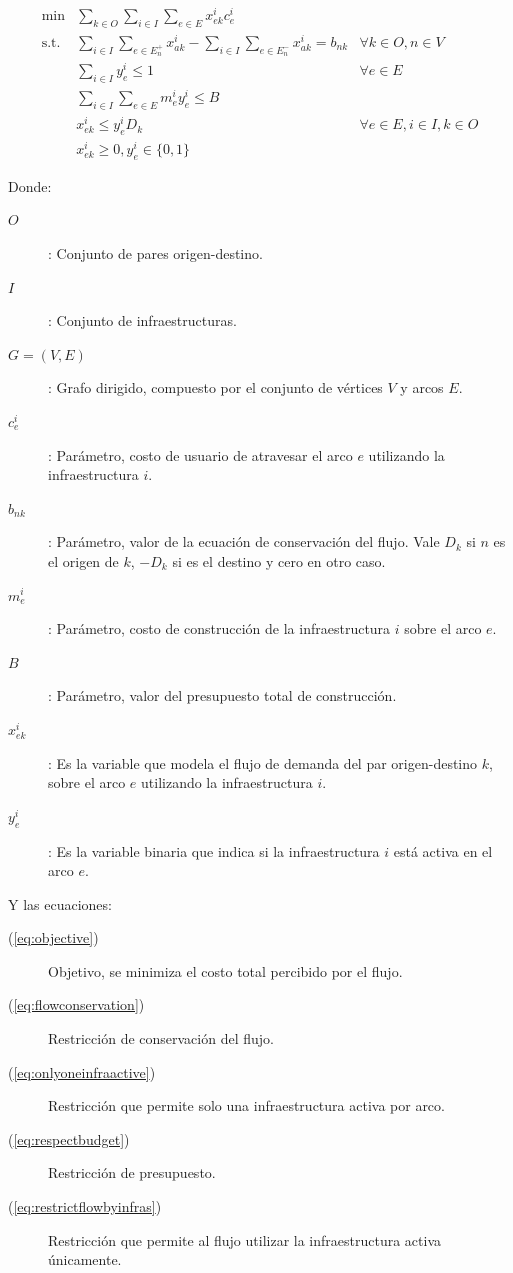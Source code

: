 \documentclass{article}
\begin{document}
  \begin{align}
    \text{min} & \sum_{k \in O} \sum_{i \in I} \sum_{e \in E} x_{ek}^i c_e^i & \label{eq:objective} \\
    \text{s.t.} & \sum_{i \in I}\sum_{e \in E_n^+} x_{ak}^i - \sum_{i \in I}\sum_{e \in E_n^-} x_{ak}^i = b_{nk} & \forall k \in O, n \in V \label{eq:flowconservation} \\
          & \sum_{i \in I} y_{e}^i \leq 1 & \forall e \in E \label{eq:onlyoneinfraactive} \\
          & \sum_{i \in I} \sum_{e \in E} m_e^i y_e^i \leq B & \label{eq:respectbudget} \\
          & x_{ek}^i \leq y_e^i  D_k & \forall e \in E, i \in I, k \in O \label{eq:restrictflowbyinfras} \\
          & x_{ek}^i \geq 0, y_e^i \in \{0,1\} &
  \end{align}

  Donde:
  \begin{description}
    \item[$O$]: Conjunto de pares origen-destino.
    \item[$I$]: Conjunto de infraestructuras.
    \item[$G=(V, E)$]: Grafo dirigido, compuesto por el conjunto de vértices $V$ y arcos $E$.
    \item[$c_e^i$]: Parámetro, costo de usuario de atravesar el arco $e$ utilizando la infraestructura $i$.
    \item[$b_{nk}$]: Parámetro, valor de la ecuación de conservación del flujo. Vale $D_k$ si $n$ es el origen de $k$, $-D_k$ si es el destino y cero en otro caso.
    \item[$m_e^i$]: Parámetro, costo de construcción de la infraestructura $i$ sobre el arco $e$.
    \item[$B$]: Parámetro, valor del presupuesto total de construcción.
    \item[$x_{ek}^i$]: Es la variable que modela el flujo de demanda del par origen-destino $k$, sobre el arco $e$ utilizando la infraestructura $i$.
    \item[$y_e^i$]: Es la variable binaria que indica si la infraestructura $i$ está activa en el arco $e$.
  \end{description}

  Y las ecuaciones:

  \begin{description}
    \item[(\ref{eq:objective})] Objetivo, se minimiza el costo total percibido por el flujo.
    \item[(\ref{eq:flowconservation})] Restricción de conservación del flujo.
    \item[(\ref{eq:onlyoneinfraactive})] Restricción que permite solo una infraestructura activa por arco.
    \item[(\ref{eq:respectbudget})] Restricción de presupuesto.
    \item[(\ref{eq:restrictflowbyinfras})] Restricción que permite al flujo utilizar la infraestructura activa únicamente.
  \end{description}
\end{document}

